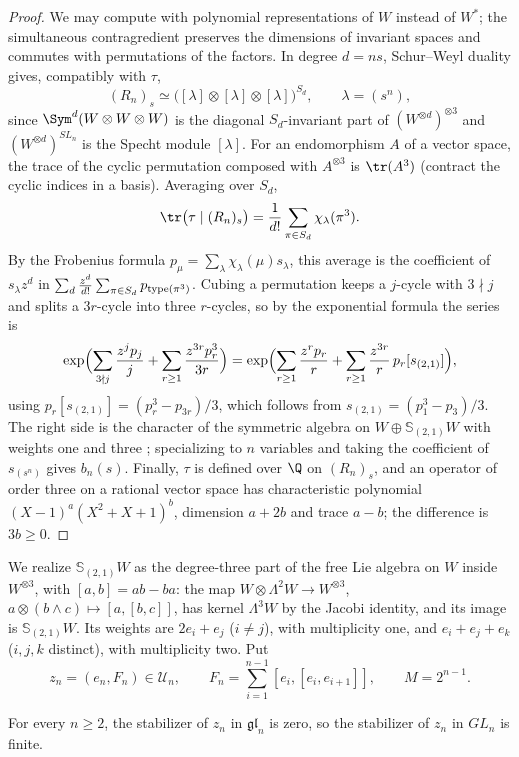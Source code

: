 \begin{proof}
We may compute with polynomial representations of $W$ instead of $W^*$; the
simultaneous contragredient preserves the dimensions of invariant spaces and
commutes with permutations of the factors. In degree $d=ns$, Schur--Weyl
duality gives, compatibly with $\tau$,
\[
 (R_n)_s\simeq\bigl([\lambda]\otimes[\lambda]\otimes[\lambda]\bigr)^{S_d},
 \qquad\lambda=(s^n),
\]
since $\Sym^d(W\otimes W\otimes W)$ is the diagonal $S_d$-invariant part of
$(W^{\otimes d})^{\otimes3}$ and $(W^{\otimes d})^{SL_n}$ is the Specht module
$[\lambda]$. For an endomorphism $A$ of a vector space, the trace of the cyclic
permutation composed with $A^{\otimes3}$ is $\tr(A^3)$ (contract the cyclic
indices in a basis). Averaging over $S_d$,
\[
 \tr\bigl(\tau\mid(R_n)_s\bigr)=\frac1{d!}\sum_{\pi\in S_d}\chi_\lambda(\pi^3).
\]
By the Frobenius formula $p_\mu=\sum_\lambda\chi_\lambda(\mu)s_\lambda$, this
average is the coefficient of $s_\lambda z^d$ in
$\sum_d\frac{z^d}{d!}\sum_{\pi\in S_d}p_{{\rm type}(\pi^3)}$. Cubing a
permutation keeps a $j$-cycle with $3\nmid j$ and splits a $3r$-cycle into three
$r$-cycles, so by the exponential formula the series is
\[
 \exp\Bigl(\sum_{3\nmid j}\frac{z^jp_j}j+\sum_{r\ge1}\frac{z^{3r}p_r^3}{3r}\Bigr)
 =\exp\Bigl(\sum_{r\ge1}\frac{z^rp_r}r+\sum_{r\ge1}\frac{z^{3r}}r\,
 p_r[s_{(2,1)}]\Bigr),
\]
using $p_r[s_{(2,1)}]=(p_r^3-p_{3r})/3$, which follows from
$s_{(2,1)}=(p_1^3-p_3)/3$. The right side is the character of the symmetric
algebra on $W\oplus\mathbb S_{(2,1)}W$ with weights one and three
\cite[Chapter I, \S\S7--8]{Macdonald}; specializing to $n$ variables and taking
the coefficient of $s_{(s^n)}$ gives $b_n(s)$. Finally, $\tau$ is defined over
$\Q$ on $(R_n)_s$, and an operator of order three on a rational vector space has
characteristic polynomial $(X-1)^a(X^2+X+1)^b$, dimension $a+2b$ and trace
$a-b$; the difference is $3b\ge0$.
\end{proof}

We realize $\mathbb S_{(2,1)}W$ as the degree-three part of the free Lie
algebra on $W$ inside $W^{\otimes3}$, with $[a,b]=ab-ba$: the map
$W\otimes\Lambda^2W\to W^{\otimes3}$, $a\otimes(b\wedge c)\mapsto[a,[b,c]]$,
has kernel $\Lambda^3W$ by the Jacobi identity, and its image is
$\mathbb S_{(2,1)}W$. Its weights are $2e_i+e_j$ ($i\ne j$), with multiplicity
one, and $e_i+e_j+e_k$ ($i,j,k$ distinct), with multiplicity two. Put
\[
 z_n=(e_n,F_n)\in\mathcal U_n,\qquad F_n=\sum_{i=1}^{n-1}[e_i,[e_i,e_{i+1}]],
 \qquad M=2^{n-1}.
\]

\begin{lemma}\label{lem:liezero}
For every $n\ge2$, the stabilizer of $z_n$ in $\mathfrak{gl}_n$ is zero, so the
stabilizer of $z_n$ in $GL_n$ is finite.
\end{lemma}

